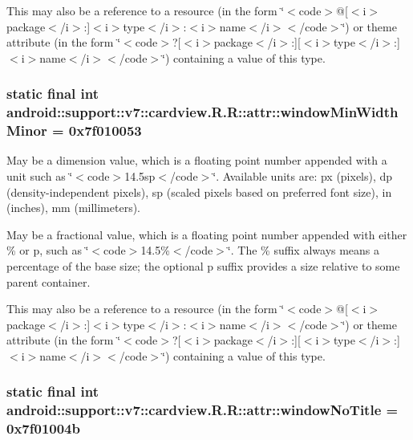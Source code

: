 This may also be a reference to a resource (in the form \char`\"{}$<$code$>$@\mbox{[}$<$i$>$package$<$/i$>$:\mbox{]}$<$i$>$type$<$/i$>$:$<$i$>$name$<$/i$>$$<$/code$>$\char`\"{}) or theme attribute (in the form \char`\"{}$<$code$>$?\mbox{[}$<$i$>$package$<$/i$>$:\mbox{]}\mbox{[}$<$i$>$type$<$/i$>$:\mbox{]}$<$i$>$name$<$/i$>$$<$/code$>$\char`\"{}) containing a value of this type. \hypertarget{classandroid_1_1support_1_1v7_1_1cardview_1_1_r_1_1attr_1d6a13803509434832faafb90ba33fa8}{
\subsubsection[{windowMinWidthMinor}]{\setlength{\rightskip}{0pt plus 5cm}static final int android::support::v7::cardview.R.R::attr::windowMinWidthMinor = 0x7f010053}}
\label{classandroid_1_1support_1_1v7_1_1cardview_1_1_r_1_1attr_1d6a13803509434832faafb90ba33fa8}


May be a dimension value, which is a floating point number appended with a unit such as \char`\"{}$<$code$>$14.5sp$<$/code$>$\char`\"{}. Available units are: px (pixels), dp (density-independent pixels), sp (scaled pixels based on preferred font size), in (inches), mm (millimeters). 

May be a fractional value, which is a floating point number appended with either \% or p, such as \char`\"{}$<$code$>$14.5\%$<$/code$>$\char`\"{}. The \% suffix always means a percentage of the base size; the optional p suffix provides a size relative to some parent container. 

This may also be a reference to a resource (in the form \char`\"{}$<$code$>$@\mbox{[}$<$i$>$package$<$/i$>$:\mbox{]}$<$i$>$type$<$/i$>$:$<$i$>$name$<$/i$>$$<$/code$>$\char`\"{}) or theme attribute (in the form \char`\"{}$<$code$>$?\mbox{[}$<$i$>$package$<$/i$>$:\mbox{]}\mbox{[}$<$i$>$type$<$/i$>$:\mbox{]}$<$i$>$name$<$/i$>$$<$/code$>$\char`\"{}) containing a value of this type. \hypertarget{classandroid_1_1support_1_1v7_1_1cardview_1_1_r_1_1attr_8df2f8ece8ecad1a5c634274e3960e33}{
\subsubsection[{windowNoTitle}]{\setlength{\rightskip}{0pt plus 5cm}static final int android::support::v7::cardview.R.R::attr::windowNoTitle = 0x7f01004b}}
\label{classandroid_1_1support_1_1v7_1_1cardview_1_1_r_1_1attr_8df2f8ece8ecad1a5c634274e3960e33}


